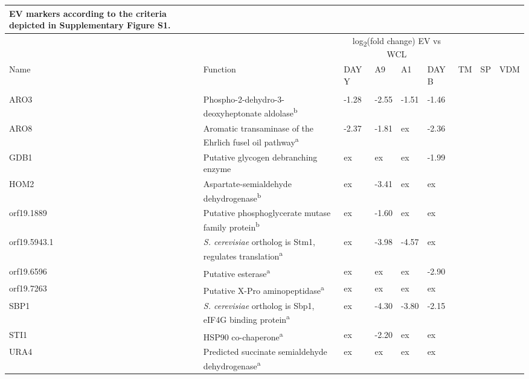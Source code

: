 \begin{ThreePartTable}
\begin{longtable}[t]{lllllllll}
{              EV markers according to the criteria depicted in 
              Supplementary Figure S1.}\\
\toprule
\multicolumn{2}{c}{ } & \multicolumn{4}{c}{log\textsubscript{2}(fold change) EV vs WCL} & \multicolumn{3}{c}{ } \\
\cmidrule(l{3pt}r{3pt}){3-6}
Name & Function & DAY Y & A9 & A1 & DAY B & TM & SP & VDM\\
\midrule
\addlinespace[0.3em]
\multicolumn{9}{l}{\textbf{Cytoplasm}}\\
\hspace{1em}ARO3 & Phospho-2-dehydro-3-deoxyheptonate aldolase\textsuperscript{b} & -1.28 & -2.55 & -1.51 & -1.46 &  &  & \\
\hspace{1em}ARO8 & Aromatic transaminase of the Ehrlich fusel oil pathway\textsuperscript{a} & -2.37 & -1.81 & ex & -2.36 &  &  & \\
\hspace{1em}GDB1 & Putative glycogen debranching enzyme & ex & ex & ex & -1.99 &  &  & \\
\hspace{1em}HOM2 & Aspartate-semialdehyde dehydrogenase\textsuperscript{b} & ex & -3.41 & ex & ex &  &  & \\
\hspace{1em}orf19.1889 & Putative phosphoglycerate mutase family protein\textsuperscript{b} & ex & -1.60 & ex & ex &  &  & \\
\hspace{1em}orf19.5943.1 & \textit{S. cerevisiae} ortholog is Stm1, regulates translation\textsuperscript{a} & ex & -3.98 & -4.57 & ex &  &  & \\
\hspace{1em}orf19.6596 & Putative esterase\textsuperscript{a} & ex & ex & ex & -2.90 &  &  & \\
\hspace{1em}orf19.7263 & Putative X-Pro aminopeptidase\textsuperscript{a} & ex & ex & ex & ex &  &  & \\
\hspace{1em}SBP1 & \textit{S. cerevisiae} ortholog is Sbp1, eIF4G binding protein\textsuperscript{a} & ex & -4.30 & -3.80 & -2.15 &  &  & \\
\hspace{1em}STI1 & HSP90 co-chaperone\textsuperscript{a} & ex & -2.20 & ex & ex &  &  & \\
\hspace{1em}URA4 & Predicted succinate semialdehyde dehydrogenase\textsuperscript{a} & ex & ex & ex & ex &  &  & \\

\end{longtable}
\end{ThreePartTable}
